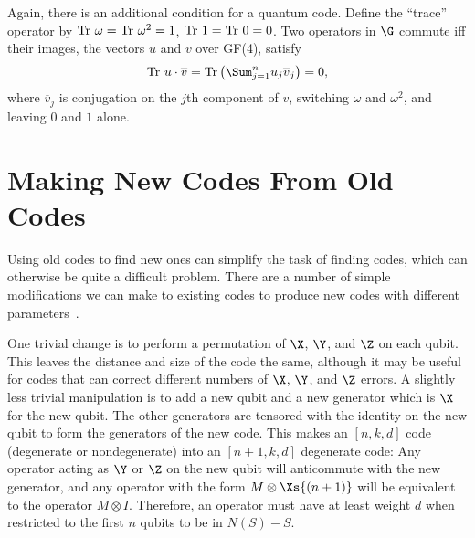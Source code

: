 Again, there is an additional condition for a quantum code.  Define the
``trace'' operator by ${\rm Tr}\ \omega = {\rm Tr}\ \omega^2 = 1$, ${\rm
Tr}\ 1 = {\rm Tr}\ 0 = 0$.  Two operators in $\G$ commute iff their images,
the vectors $u$ and $v$ over GF(4), satisfy
\begin{equation}
{\rm Tr}\ u \cdot \overline{v} = {\rm Tr}\left( \Sum_{j=1}^n u_j
\overline{v}_j \right) = 0,
\end{equation}
where $\overline{v}_j$ is conjugation on the $j$th component of $v$,
switching $\omega$ and $\omega^2$, and leaving $0$ and $1$ alone.

\section{Making New Codes From Old Codes}
\label{sec-construction}

Using old codes to find new ones can simplify the task of finding codes,
which can otherwise be quite a difficult problem.  There are a number of simple
modifications we can make to existing codes to produce new codes with
different parameters~\cite{gottesman-pasting,calderbank-GF4}.

One trivial change is to perform a permutation of $\X$, $\Y$, and $\Z$ on
each qubit.  This leaves the distance and size of the code the same,
although it may be useful for codes that can correct different numbers of
$\X$, $\Y$, and $\Z$ errors.  A slightly less trivial manipulation is to add a
new qubit and a new generator which is $\X$ for the new qubit.  The other
generators are tensored with the identity on the new qubit to form the
generators of the new code.  This makes an $[n, k, d]$ code (degenerate or
nondegenerate) into an $[n+1, k, d]$ degenerate code:  Any operator acting as
$\Y$ or $\Z$ on the new qubit will anticommute with the new generator, and any
operator with the form $M \otimes \Xs{(n+1)}$ will be equivalent to the
operator $M \otimes I$.  Therefore, an operator must have at least weight $d$
when restricted to the first $n$ qubits to be in $N(S)-S$.

